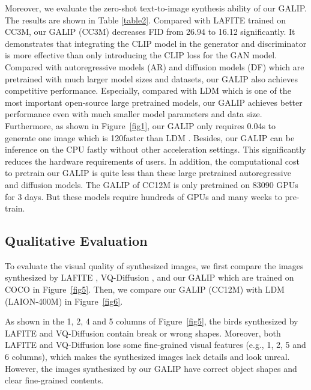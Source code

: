 \documentclass[10pt,twocolumn,letterpaper]{article}
\begin{document}
Moreover, we evaluate the zero-shot text-to-image synthesis ability of our GALIP. The results are shown in Table \ref{table2}.
Compared with LAFITE \cite{zhou2022towards} trained on CC3M, our GALIP (CC3M) decreases FID from 26.94 to 16.12 significantly.
It demonstrates that integrating the CLIP model in the generator and discriminator is more effective than only introducing the CLIP loss for the GAN model.
Compared with autoregressive models (AR) and diffusion models (DF) which are pretrained with much larger model sizes and datasets, our GALIP also achieves competitive performance.
Especially, compared with LDM \cite{rombach2022high} which is one of the most important open-source large pretrained models, our GALIP achieves better performance even with much smaller model parameters and data size.
Furthermore, as shown in Figure~\ref{fig1}, our GALIP only requires 0.04s to generate one image which is 120faster than LDM \cite{rombach2022high}.
Besides, our GALIP can be inference on the CPU fastly without other acceleration settings.
This significantly reduces the hardware requirements of users.
In addition, the computational cost to pretrain our GALIP is quite less than these large pretrained autoregressive and diffusion models.
The GALIP of CC12M is only pretrained on 83090 GPUs for 3 days. 
But these models require hundreds of GPUs and many weeks to pre-train.


\subsection{Qualitative Evaluation}
To evaluate the visual quality of synthesized images, we first compare the images synthesized by LAFITE \cite{zhou2022towards}, VQ-Diffusion \cite{gu2022vector}, and our GALIP which are trained on COCO in Figure~\ref{fig5}.
Then, we compare our GALIP (CC12M) with LDM (LAION-400M) \cite{rombach2022high,stablediff} in Figure~\ref{fig6}.

As shown in the 1, 2, 4 and 5 columns of Figure~\ref{fig5}, the birds synthesized by LAFITE \cite{zhou2022towards} and VQ-Diffusion \cite{gu2022vector} contain break or wrong shapes. 
Moreover, both LAFITE \cite{zhou2022towards} and VQ-Diffusion \cite{gu2022vector} lose some fine-grained visual features (e.g., 1, 2, 5 and 6 columns), which makes the synthesized images lack details and look unreal.
However, the images synthesized by our GALIP have correct object shapes and clear fine-grained contents.
\end{document}
